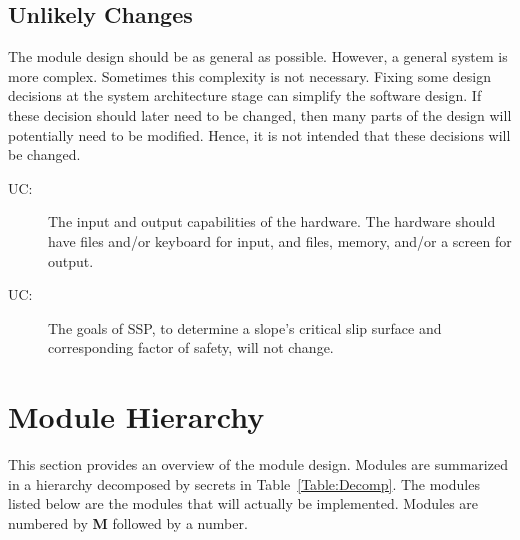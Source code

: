 \documentclass[12pt, titlepage]{article}
\newcommand{\progname}{SSP}
\newcounter{ucnum}
\begin{document}
\subsection{Unlikely Changes} \label{SecUchange}

\hspace{3ex}The module design should be as general as
possible. However, a general system is more complex. Sometimes this
complexity is not necessary. Fixing some design decisions at the
system architecture stage can simplify the software design. If these
decision should later need to be changed, then many parts of the
design will potentially need to be modified. Hence, it is not intended
that these decisions will be changed.

\begin{description}
\item [UC\theucnum \label{UC_IO}:] The input and output
  capabilities of the hardware. The hardware should have files and/or keyboard 
  for input, and files, memory, and/or a screen for output.
\item [UC\theucnum \label{UC_SSPGoal}:] The goals of 
\progname{}, to determine a slope's critical slip surface and corresponding 
factor of safety, will not change.
 
\end{description}


\section{Module Hierarchy} \label{SecMH}

\hspace{3ex}This section provides an overview of the module
design. Modules are summarized in a hierarchy decomposed by secrets
in Table~\ref{Table:Decomp}. The modules listed below are the modules
that will actually be implemented. Modules are numbered by \textbf{M}
followed by a number.
\end{document}
